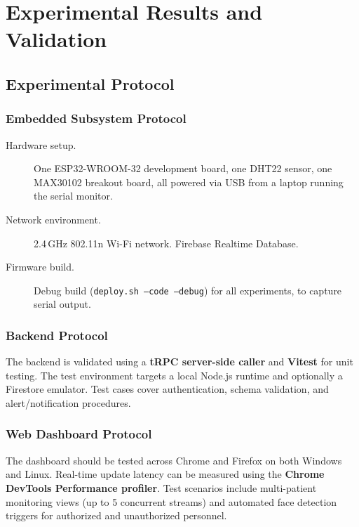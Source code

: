 
\chapter{Experimental Results and Validation}
\label{ch:results}

\section{Experimental Protocol}

\subsection{Embedded Subsystem Protocol}

\begin{description}
	\item[Hardware setup.]
	      One ESP32-WROOM-32\cite{esp32_datasheet} development board, one DHT22\cite{dht22_datasheet} sensor, one MAX30102\cite{max30102_datasheet} breakout
	      board, all powered via USB from a laptop running the serial monitor.

	\item[Network environment.]
	      2.4\,GHz 802.11n Wi-Fi network.
	      Firebase Realtime Database\cite{firebase_rtdb}.

	\item[Firmware build.]
	      Debug build (\texttt{deploy.sh --code --debug}) for all experiments, to capture
	      serial output.
\end{description}

\subsection{Backend Protocol}
The backend is validated using a \textbf{tRPC\cite{trpc} server-side caller} and
\textbf{Vitest} for unit testing. The test environment targets a local Node.js
runtime and optionally a Firestore emulator. Test cases cover authentication,
schema validation, and alert/notification procedures.

\subsection{Web Dashboard Protocol}
The dashboard should be tested across Chrome and Firefox on both Windows and Linux.
Real-time update latency can be measured using the \textbf{Chrome DevTools Performance profiler}. Test scenarios include multi-patient monitoring views (up to 5 concurrent streams) and automated face detection triggers for authorized and unauthorized personnel.

